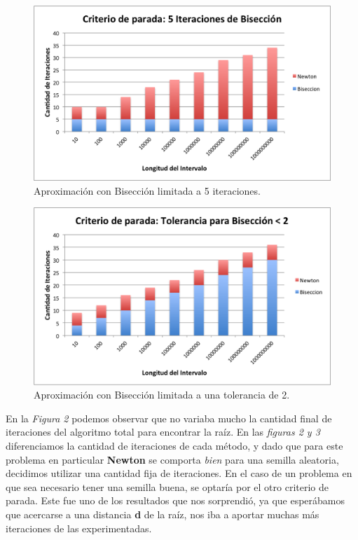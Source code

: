 \documentclass[a4paper]{article}
\begin{document}
\begin{figure}[H]
  \centering
  \includegraphics[scale=0.80]{graficos/2-BiseccionXIteraciones.png}
  \caption{Aproximación con Bisección limitada a 5 iteraciones. }
\end{figure}
 
\begin{figure}[H]
  \centering
  \includegraphics[scale=0.80]{graficos/3-BiseccionXTolerancia.png}
  \caption{Aproximación con Bisección limitada a una tolerancia de 2. }
\end{figure}

En la \textit{Figura 2} podemos observar que no variaba mucho la cantidad final de iteraciones del algoritmo total para encontrar la raíz. En las \textit{figuras 2 y 3} diferenciamos la cantidad de iteraciones de cada método, y dado que para este problema en particular \textbf{Newton} se comporta \textit{bien} para una semilla aleatoria, decidimos utilizar una cantidad fija de iteraciones.
En el caso de un problema en que sea necesario tener una semilla buena, se optaría por el otro criterio de parada.
Este fue uno de los resultados que nos sorprendió, ya que esperábamos que acercarse a una distancia \textbf{d} de la raíz, nos iba a aportar muchas más iteraciones de las experimentadas.\\
\end{document}
